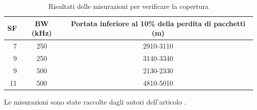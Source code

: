 \documentclass[a4paper]{report} %
\begin{document}
\begin{table}
\caption{Risultati delle misurazioni per verificare la copertura} 
\label{tab:copertura}
\begin{center}
\begin{tabular}{|r|c|c|}
SF&BW (kHz)&Portata inferiore al 10\% della perdita di pacchetti (m)\\ \hline
7&250&2910-3110\\ \hline
9&250&3140-3340\\ \hline
9&500&2130-2330\\ \hline
11&500&4810-5010\\ \hline
\end{tabular}
Le misurazioni sono state raccolte dagli autori dell'articolo \cite{art:rif.44}. \\
\end{center}
\end{table}
\end{document}
